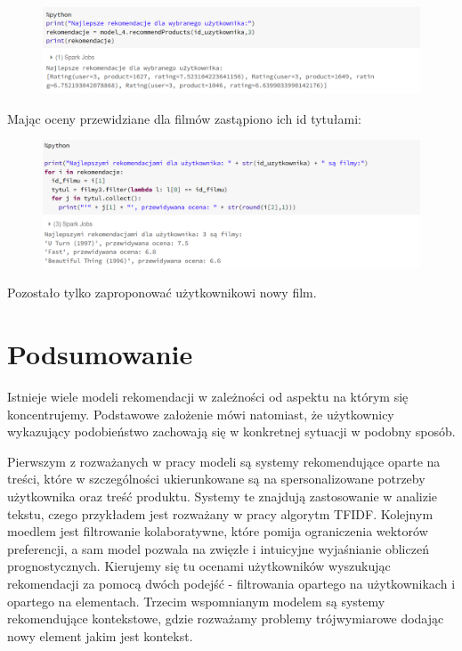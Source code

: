 \documentclass[12pt,a4paper]{report}
\begin{document}
\begin{figure}[H]
\includegraphics[scale=0.5]{obrazy/ALS17.PNG} 
\end{figure}

Mając oceny przewidziane dla filmów zastąpiono ich id tytułami:

\begin{figure}[H]
\includegraphics[scale=0.5]{obrazy/ALS18.PNG} 
\end{figure}

Pozostało tylko zaproponować użytkownikowi nowy film.


\chapter{Podsumowanie}

Istnieje wiele modeli rekomendacji w zależności od aspektu na którym się koncentrujemy. Podstawowe założenie mówi natomiast, że użytkownicy wykazujący podobieństwo zachowają się w konkretnej sytuacji w podobny sposób.

Pierwszym z rozważanych w pracy modeli są systemy rekomendujące oparte na treści, które w szczególności ukierunkowane są na spersonalizowane potrzeby użytkownika oraz treść produktu. Systemy te znajdują zastosowanie w analizie tekstu, czego przykładem jest rozważany w pracy algorytm TFIDF. Kolejnym moedlem jest filtrowanie kolaboratywne, które pomija ograniczenia wektorów preferencji, a sam model pozwala na zwięzłe i intuicyjne wyjaśnianie obliczeń prognostycznych. Kierujemy się tu ocenami użytkowników wyszukując rekomendacji za pomocą dwóch podejść - filtrowania opartego na użytkownikach i opartego na elementach. Trzecim wspomnianym modelem są systemy rekomendujące kontekstowe, gdzie rozważamy problemy trójwymiarowe dodając nowy element jakim jest kontekst.
\end{document}
